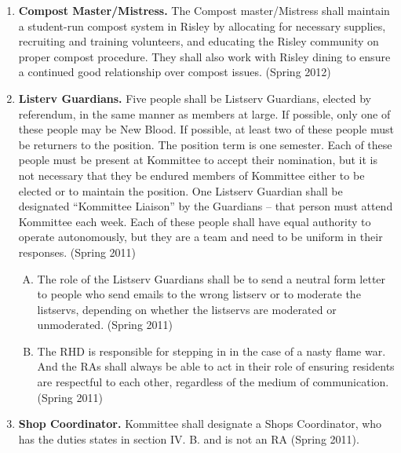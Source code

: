 \documentclass[12pt]{article}
\begin{document}
\begin{enumerate}[1.]
\item \textbf{Compost Master/Mistress.} The Compost master/Mistress shall maintain a student-run compost system in Risley by allocating for necessary supplies, recruiting and training volunteers, and educating the Risley community on proper compost procedure. They shall also work with Risley dining to ensure a continued good relationship over compost issues. (Spring 2012)
\item \textbf{Listerv Guardians.} Five people shall be Listserv Guardians, elected by referendum, in the same manner as members at large. If possible, only one of these people may be New Blood. If possible, at least two of these people must be returners to the position. The position term is one semester. Each of these people must be present at Kommittee to accept their nomination, but it is not necessary that they be endured members of Kommittee either to be elected or to maintain the position. One Listserv Guardian shall be designated “Kommittee Liaison” by the Guardians – that person must attend Kommittee each week. Each of these people shall have equal authority to operate autonomously, but they are a team and need to be uniform in their responses. (Spring 2011)
\begin{enumerate}[A.]
\item The role of the Listserv Guardians shall be to send a neutral form letter to people who send emails to the wrong listserv or to moderate the listservs, depending on whether the listservs are moderated or unmoderated. (Spring 2011) 
\item The RHD is responsible for stepping in in the case of a nasty flame war. And the RAs shall always be able to act in their role of ensuring residents are respectful to each other, regardless of the medium of communication. (Spring 2011)
\end{enumerate}
\item \textbf{Shop Coordinator.} Kommittee shall designate a Shops Coordinator, who has the duties states in section IV. B. and is not an RA (Spring 2011).
\end{enumerate}
\end{document}
